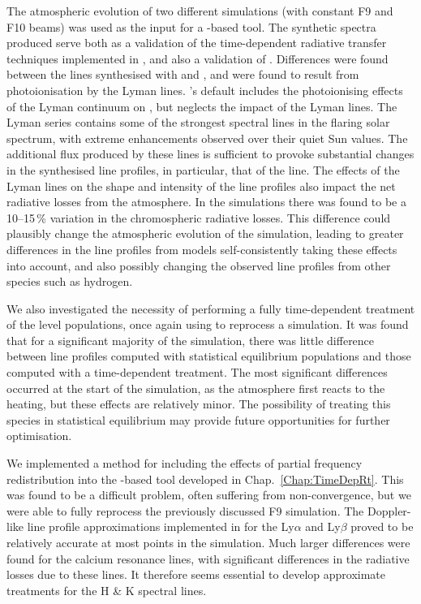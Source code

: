 The atmospheric evolution of two different \Radyn{} simulations (with constant F9 and F10 beams) was used as the input for a \Lw{}-based tool.
The synthetic spectra produced serve both as a validation of the time-dependent radiative transfer techniques implemented in \Lw{}, and also a validation of \Radyn{}.
Differences were found between the \Caii{} lines synthesised with \Radyn{} and \Lw{}, and were found to result from photoionisation by the Lyman lines.
\Radyn{}'s default includes the photoionising effects of the Lyman continuum on \Caii{}, but neglects the impact of the Lyman lines.
The Lyman series contains some of the strongest spectral lines in the flaring solar spectrum, with extreme enhancements observed over their quiet Sun values.
The additional flux produced by these lines is sufficient to provoke substantial changes in the synthesised \Caii{} line profiles, in particular, that of the \CaLine{} line.
The effects of the Lyman lines on the shape and intensity of the \Caii{} line profiles also impact the net radiative losses from the atmosphere.
In the simulations there was found to be a 10--15\,\% variation in the chromospheric radiative losses.
This difference could plausibly change the atmospheric evolution of the simulation, leading to greater differences in the \Caii{} line profiles from models self-consistently taking these effects into account, and also possibly changing the observed line profiles from other species such as hydrogen.

We also investigated the necessity of performing a fully time-dependent treatment of the \Caii{} level populations, once again using \Lw{} to reprocess a \Radyn{} simulation.
It was found that for a significant majority of the simulation, there was little difference between line profiles computed with statistical equilibrium populations and those computed with a time-dependent treatment.
The most significant differences occurred at the start of the simulation, as the atmosphere first reacts to the heating, but these effects are relatively minor.
The possibility of treating this species in statistical equilibrium may provide future opportunities for further optimisation.

We implemented a method for including the effects of partial frequency redistribution into the \Lw{}-based tool developed in Chap.~\ref{Chap:TimeDepRt}.
This was found to be a difficult problem, often suffering from non-convergence, but we were able to fully reprocess the previously discussed F9 simulation.
The Doppler-like line profile approximations implemented in \Radyn{} for the Ly$\alpha$ and Ly$\beta$ proved to be relatively accurate at most points in the simulation.
Much larger differences were found for the calcium resonance lines, with significant differences in the radiative losses due to these lines.
It therefore seems essential to develop approximate treatments for the \Caii{} H \& K spectral lines.

